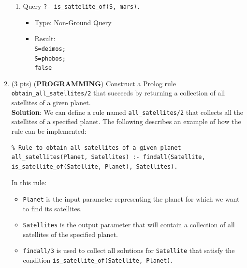 \documentclass[12pt]{article}
\begin{document}
\begin{spacing}{1.5}
\begin{enumerate}
\begin{enumerate}
		      	\item 
		      	      Query \texttt{?- is\_sattelite\_of(S, mars).}
		      	      \begin{itemize}
		      	      	\item Type: Non-Ground Query
		      	      	\item Result: \texttt{\\
		      	      		S=deimos;\\
		      	      		S=phobos;\\
		      	      	false}
		      	      \end{itemize}
		      	              
		      \end{enumerate}
		      		      		      		      		      		      		      		      
		\item
		      (3 pts) (\uline{\textbf{PROGRAMMING}}) Construct a Prolog rule \texttt{obtain\_all\_satellites/2}
		      that succeeds by returning a collection of all satellites of a given planet.\\
		      		      		      		      		      		      		      		      
		      \textbf{Solution}: We can define a rule named \texttt{all\_satellites/2} that collects all the satellites of a specified planet. The following describes an example of how the rule can be implemented:\\
		      		      		      		      		      		      		      		      
		      \begin{lstlisting}
% Rule to obtain all satellites of a given planet
all_satellites(Planet, Satellites) :- findall(Satellite, is_satellite_of(Satellite, Planet), Satellites).
		      \end{lstlisting}
		      		      		      		      		      		      		      		      
		      In this rule:
		      \begin{itemize}
		      	\item \texttt{Planet} is the input parameter representing the planet for which we want to           find its satellites.
		      	       
		      	\item \texttt{Satellites} is the output parameter that will contain a collection of all satellites of the specified planet.
		      	       
		      	\item \texttt{findall/3} is used to collect all solutions for \texttt{Satellite} that satisfy the condition \texttt{is\_satellite\_of(Satellite, Planet)}.
		      \end{itemize}
		      		      		      		      		      		      		      		      

\end{enumerate}
\end{spacing}
\end{document}
